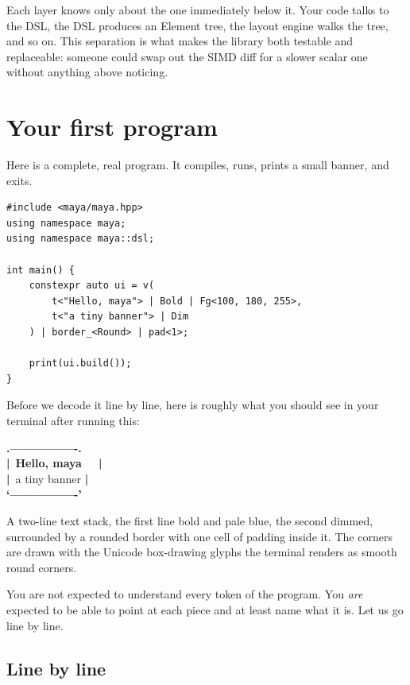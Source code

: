 Each layer knows only about the one immediately below it. Your code
talks to the DSL, the DSL produces an Element tree, the layout engine
walks the tree, and so on. This separation is what makes the library
both testable and replaceable: someone could swap out the SIMD diff
for a slower scalar one without anything above noticing.

\section{Your first \maya{} program}

Here is a complete, real \maya{} program. It compiles, runs, prints a
small banner, and exits.

\begin{lstlisting}
#include <maya/maya.hpp>
using namespace maya;
using namespace maya::dsl;

int main() {
    constexpr auto ui = v(
        t<"Hello, maya"> | Bold | Fg<100, 180, 255>,
        t<"a tiny banner"> | Dim
    ) | border_<Round> | pad<1>;

    print(ui.build());
}
\end{lstlisting}

Before we decode it line by line, here is roughly what you should
see in your terminal after running this:

\begin{terminalbox}
\textcolor{mayablue}{\textbf{.----------------.}}\\
\textcolor{mayablue}{\textbf{|}}\, \textbf{Hello, maya}~~\, \textcolor{mayablue}{\textbf{|}}\\
\textcolor{mayablue}{\textbf{|}}\, a tiny banner \textcolor{mayablue}{\textbf{|}}\\
\textcolor{mayablue}{\textbf{`----------------'}}
\end{terminalbox}

A two-line text stack, the first line bold and pale blue, the second
dimmed, surrounded by a rounded border with one cell of padding
inside it. The corners are drawn with the Unicode box-drawing
glyphs the terminal renders as smooth round corners.

You are not expected to understand every token of the program. You
\emph{are} expected to be able to point at each piece and at least
name what it is. Let us go line by line.

\subsection{Line by line}


